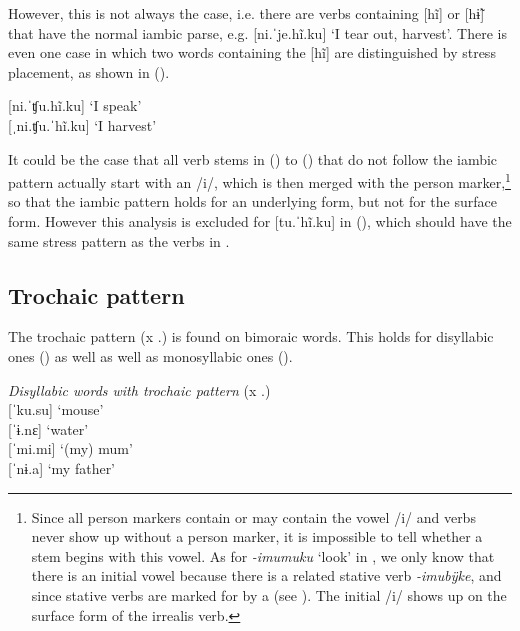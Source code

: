 
However, this is not always the case, i.e. there are verbs containing [hĩ] or [hɨ̃] that have the normal iambic parse, e.g. [ni.ˈje.hĩ.ku]  ‘I tear out, harvest’. There is even one case in which two words containing the  [hĩ] are distinguished by stress placement, as shown in ().

\ea\label{ex:chujiku} %
    [ni.ˈʧu.hĩ.ku]  \tab ‘I speak’\\
  {[}ˌni.ʧu.ˈhĩ.ku] \tab ‘I harvest’\\
    \xe

It could be the case that all verb stems in () to () that do not follow the iambic pattern actually start with an /i/, which is then merged with the person marker,\footnote{Since all person markers contain or may contain the vowel /i/ and verbs never show up without a person marker, it is impossible to tell whether a stem begins with this vowel. As for \textit{-imumuku} ‘look’ in , we only know that there is an initial vowel because there is a related stative verb \textit{-imubÿke}, and since stative verbs are marked for  by a  (see ). The initial /i/ shows up on the surface form of the irrealis verb.} so that the iambic pattern holds for an underlying form, but not for the surface form. However this analysis is excluded for {[}tu.ˈhĩ.ku] in (), which should have the same stress pattern as the verbs in .


\subsection{Trochaic pattern}\label{sec:TrochaicPattern}

The trochaic pattern (x .) is found on bimoraic words. This holds for disyllabic ones () as well as well as monosyllabic ones (). 

\ea\label{ex:DisyllabicWords}
 \textit{Disyllabic words with trochaic pattern} (x .)\\
    {[}ˈku.su] \tab ‘mouse’\\
    {[}ˈɨ.nɛ] \tab\tab ‘water’\\
   {[}ˈmi.mi] \tab ‘(my) mum’ \\
    {[}ˈnɨ.a] \tab ‘my father’ \\ %
\xe


